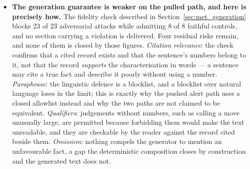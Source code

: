 \begin{itemize}
        The most likely explanation is not that the model is broken but that it is
        \emph{redundant}. Materiality among logged decisions runs at $0.626$ against a training
        prevalence of $0.378$, because decisions are only logged for headlines that already cleared
        the relevance and freshness filters. Those cheap upstream stages have already removed most
        of what the learned stage was trained to remove, leaving it little to separate. This is a
        general lesson about placing a learned component in a pipeline rather than a fault in the
        component: a model evaluated in isolation and deployed behind filters is not evaluated on
        the distribution it will see. The offline result of Chapter~\ref{chap:casestudies} stands
        as an evaluation-set result; the deployed gate has not earned its place on this evidence,
        and saying so is cheaper than defending it.
  \item \textbf{The generation guarantee is weaker on the pulled path, and here is precisely how.}
        The fidelity check described in Section~\ref{sec:met_generation} blocks $23$ of $23$
        adversarial attacks while admitting $8$ of $8$ faithful controls, and no section carrying a
        violation is delivered. Four residual risks remain, and none of them is closed by those
        figures. \emph{Citation relevance}: the check confirms that a cited record exists and that
        the sentence's numbers belong to it, not that the record \emph{supports} the characterisation
        in words --- a sentence may cite a true fact and describe it poorly without using a number.
        \emph{Paraphrase}: the linguistic defence is a blocklist, and a blocklist over natural
        language loses in the limit; this is exactly why the pushed alert path uses a closed
        allowlist instead and why the two paths are not claimed to be equivalent.
        \emph{Qualifiers}: judgements without numbers, such as calling a move unusually large,
        are permitted because forbidding them would make the text unreadable, and they are checkable
        by the reader against the record cited beside them. \emph{Omission}: nothing compels the
        generator to mention an unfavourable fact, a gap the deterministic composition closes by
        construction and the generated text does not.


\end{itemize}
